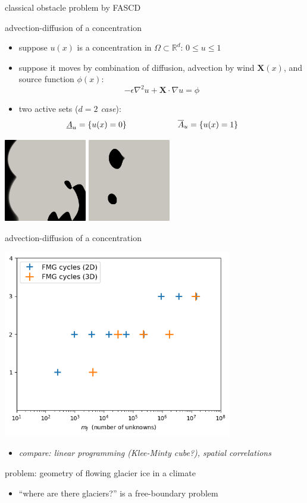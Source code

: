 \documentclass[svgnames,
               hyperref={colorlinks,citecolor=DeepPink4,linkcolor=FireBrick,urlcolor=Maroon},
               usepdftitle=false]  %
               {beamer}
\newcommand{\eps}{\epsilon}
\newcommand{\RR}{\mathbb{R}}
\newcommand{\grad}{\nabla}
\begin{document}
\begin{frame}{classical obstacle problem by FASCD}

 \hfill
{}%
\end{frame}


\begin{frame}{advection-diffusion of a concentration}

\begin{itemize}
\item suppose $u(x)$ is a concentration in $\Omega \subset \RR^d$: \qquad $0\le u\le 1$
\item suppose it moves by combination of diffusion, advection by wind $\bm{X}(x)$, and source function $\phi(x)$:
    $$-\eps \grad^2 u + \bm{X}\cdot \grad u = \phi$$
\item two active sets (\emph{$d=2$ case}):
    $$\underline{A}_u = \{u(x) = 0\} \hspace{22mm} \overline{A}_u = \{u(x) = 1\} \hspace{8mm}$$
\end{itemize}

\centering
\includegraphics[width=0.27\textwidth]{../paper/fixfigs/poll2d-zero-set.png} \hspace{18mm}
\includegraphics[width=0.27\textwidth]{../paper/fixfigs/poll2d-one-set.png}
\end{frame}


\begin{frame}{advection-diffusion of a concentration}

\begin{center}
\includegraphics[width=0.75\textwidth]{../talk-dms/figs/advdiff.png}
\end{center}

\scriptsize
\begin{itemize}
\item[] \emph{compare: linear programming (Klee-Minty cube?), spatial correlations}
\end{itemize}
\end{frame}


\begin{frame}{problem: geometry of flowing glacier ice in a climate}

\begin{itemize}
\item ``where are there glaciers?'' is a free-boundary problem
\end{itemize}

\incl
\end{frame}
\end{document}
